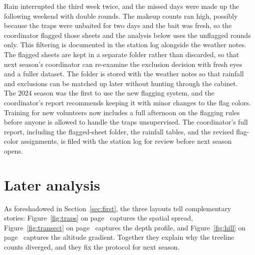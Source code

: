 \documentclass[11pt]{article}
\begin{document}
Rain interrupted the third week twice, and the missed days were made up the following weekend with double rounds. The makeup counts ran high, possibly because the traps were unbaited for two days and the bait was fresh, so the coordinator flagged those sheets and the analysis below uses the unflagged rounds only. This filtering is documented in the station log alongside the weather notes. The flagged sheets are kept in a separate folder rather than discarded, so that next season's coordinator can re-examine the exclusion decision with fresh eyes and a fuller dataset. The folder is stored with the weather notes so that rainfall and exclusions can be matched up later without hunting through the cabinet. The 2024 season was the first to use the new flagging system, and the coordinator's report recommends keeping it with minor changes to the flag colors. Training for new volunteers now includes a full afternoon on the flagging rules before anyone is allowed to handle the traps unsupervised. The coordinator's full report, including the flagged-sheet folder, the rainfall tables, and the revised flag-color assignments, is filed with the station log for review before next season opens.
\section{Later analysis}
\label{sec:later}
As foreshadowed in Section~\ref{sec:first}, the three layouts tell complementary stories: Figure~\ref{fig:traps} on page~\pageref{fig:traps} captures the spatial spread, Figure~\ref{fig:transect} on page~\pageref{fig:transect} captures the depth profile, and Figure~\ref{fig:hill} on page~\pageref{fig:hill} captures the altitude gradient. Together they explain why the treeline counts diverged, and they fix the protocol for next season.
\end{document}
